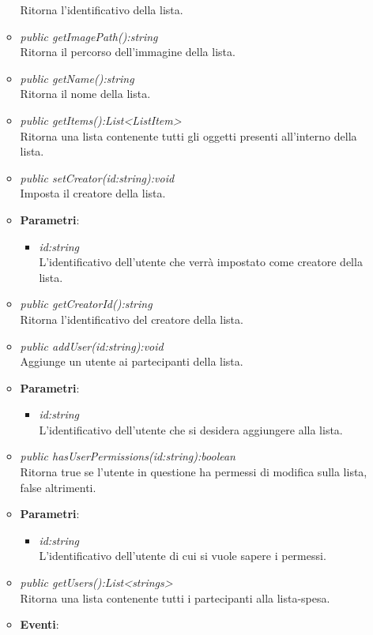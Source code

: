 \begin{itemize}
\begin{itemize}
	Ritorna l'identificativo della lista.
	\item \textit{public getImagePath():string}\\
	Ritorna il percorso dell'immagine della lista.
	\item \textit{public getName():string}\\
	Ritorna il nome della lista.
	\item \textit{public getItems():List<ListItem>}\\
	Ritorna una lista contenente tutti gli oggetti presenti all'interno della lista.
	\item \textit{public setCreator(id:string):void}\\
	Imposta il creatore della lista.
				\item{\textbf{Parametri}: \begin{itemize}
				\item \textit{id:string}\\
				L'identificativo dell'utente che verrà impostato come creatore della lista.
			\end{itemize}}
	\item \textit{public getCreatorId():string}\\
	Ritorna l'identificativo del creatore della lista.
	\item \textit{public addUser(id:string):void}\\
	Aggiunge un utente ai partecipanti della lista.
				\item{\textbf{Parametri}: \begin{itemize}
				\item \textit{id:string}\\
				L'identificativo dell'utente che si desidera aggiungere alla lista.
			\end{itemize}}
	\item \textit{public hasUserPermissions(id:string):boolean}\\
	Ritorna true se l'utente in questione ha permessi di modifica sulla lista, false altrimenti.
				\item{\textbf{Parametri}: \begin{itemize}
				\item \textit{id:string}\\
				L'identificativo dell'utente di cui si vuole sapere i permessi.
			\end{itemize}}
	\item \textit{public getUsers():List<strings>}\\
	Ritorna una lista contenente tutti i partecipanti alla lista-spesa.
\item \textbf{Eventi}:
\end{itemize}


\end{itemize}
